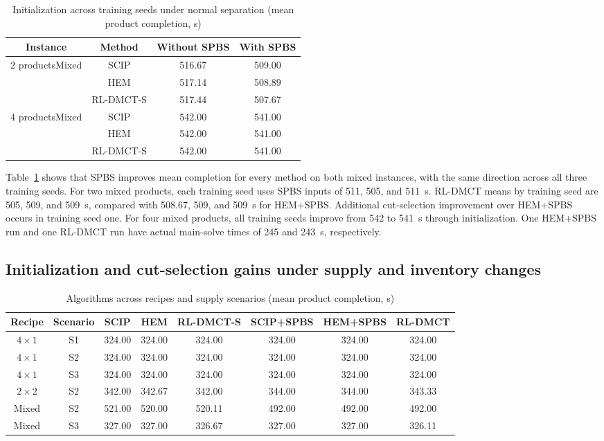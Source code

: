 \documentclass[final,5p,times,twocolumn]{elsarticle}
\begin{document}
\begin{table}[!htbp]
\centering\small
\caption{Initialization across training seeds under normal separation (mean product completion, s)}
\label{tab:journal-training-cn}
\begin{tabular}{cccc}\toprule
Instance & Method & Without SPBS & With SPBS\\\midrule
\multirow[c]{3}{*}{2 productsMixed} & SCIP & 516.67 & 509.00\\
 & HEM & 517.14 & 508.89\\
 & RL-DMCT-S & 517.44 & 507.67\\
\multirow[c]{3}{*}{4 productsMixed} & SCIP & 542.00 & 541.00\\
 & HEM & 542.00 & 541.00\\
 & RL-DMCT-S & 542.00 & 541.00\\
\bottomrule\end{tabular}
\end{table}


Table~\ref{tab:journal-training-cn} shows that SPBS improves mean completion for every method on both mixed instances, with the same direction across all three training seeds. For two mixed products, each training seed uses SPBS inputs of 511, 505, and 511~s. RL-DMCT means by training seed are 505, 509, and 509~s, compared with 508.67, 509, and 509~s for HEM+SPBS. Additional cut-selection improvement over HEM+SPBS occurs in training seed one. For four mixed products, all training seeds improve from 542 to 541~s through initialization. One HEM+SPBS run and one RL-DMCT run have actual main-solve times of 245 and 243~s, respectively.

\subsection{Initialization and cut-selection gains under supply and inventory changes}
\label{sec:journal-transfer-cn}


\begin{table}[!t]
\centering\small
\caption{Algorithms across recipes and supply scenarios (mean product completion, s)}
\label{tab:journal-transfer-cn}
\begin{tabular}{cccccccc}\toprule
Recipe & Scenario & SCIP & HEM & RL-DMCT-S & SCIP+SPBS & HEM+SPBS & RL-DMCT\\\midrule
$4\times1$ & S1 & 324.00 & 324.00 & 324.00 & 324.00 & 324.00 & 324.00\\
$4\times1$ & S2 & 324.00 & 324.00 & 324.00 & 324.00 & 324.00 & 324.00\\
$4\times1$ & S3 & 324.00 & 324.00 & 324.00 & 324.00 & 324.00 & 324.00\\
$2\times2$ & S2 & 342.00 & 342.67 & 342.00 & 344.00 & 344.00 & 343.33\\
Mixed & S2 & 521.00 & 520.00 & 520.11 & 492.00 & 492.00 & 492.00\\
Mixed & S3 & 327.00 & 327.00 & 326.67 & 327.00 & 327.00 & 326.11\\
\bottomrule\end{tabular}
\end{table}
\end{document}
